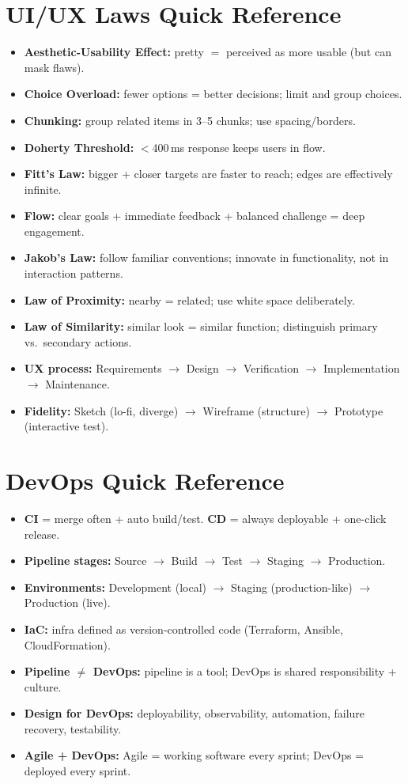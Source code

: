 \documentclass[hidelinks]{article}
\begin{document}
\section{UI/UX Laws Quick Reference}
\begin{itemize}
  \item \textbf{Aesthetic-Usability Effect:} pretty $=$ perceived as more usable (but can mask flaws).
  \item \textbf{Choice Overload:} fewer options = better decisions; limit and group choices.
  \item \textbf{Chunking:} group related items in 3--5 chunks; use spacing/borders.
  \item \textbf{Doherty Threshold:} $<$400\,ms response keeps users in flow.
  \item \textbf{Fitt's Law:} bigger + closer targets are faster to reach; edges are effectively infinite.
  \item \textbf{Flow:} clear goals + immediate feedback + balanced challenge = deep engagement.
  \item \textbf{Jakob's Law:} follow familiar conventions; innovate in functionality, not in interaction patterns.
  \item \textbf{Law of Proximity:} nearby = related; use white space deliberately.
  \item \textbf{Law of Similarity:} similar look = similar function; distinguish primary vs.\ secondary actions.
  \item \textbf{UX process:} Requirements $\to$ Design $\to$ Verification $\to$ Implementation $\to$ Maintenance.
  \item \textbf{Fidelity:} Sketch (lo-fi, diverge) $\to$ Wireframe (structure) $\to$ Prototype (interactive test).
\end{itemize}

\section{DevOps Quick Reference}
\begin{itemize}
  \item \textbf{CI} = merge often + auto build/test. \textbf{CD} = always deployable + one-click release.
  \item \textbf{Pipeline stages:} Source $\to$ Build $\to$ Test $\to$ Staging $\to$ Production.
  \item \textbf{Environments:} Development (local) $\to$ Staging (production-like) $\to$ Production (live).
  \item \textbf{IaC:} infra defined as version-controlled code (Terraform, Ansible, CloudFormation).
  \item \textbf{Pipeline $\ne$ DevOps:} pipeline is a tool; DevOps is shared responsibility + culture.
  \item \textbf{Design for DevOps:} deployability, observability, automation, failure recovery, testability.
  \item \textbf{Agile + DevOps:} Agile = working software every sprint; DevOps = deployed every sprint.
\end{itemize}
\end{document}
